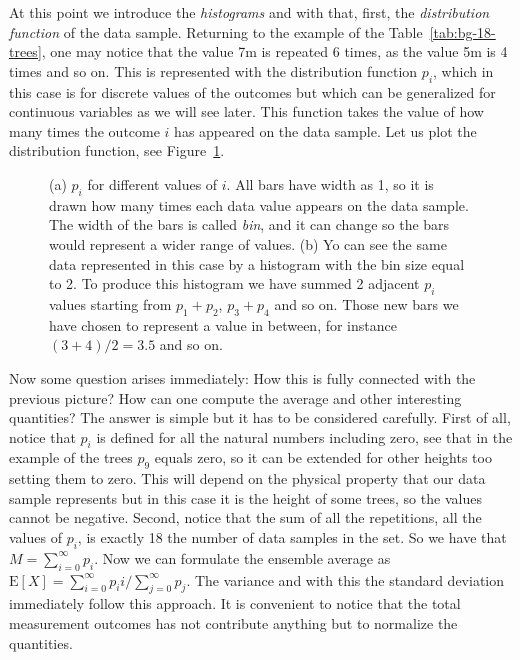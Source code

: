 At this point we introduce the \emph{histograms} and with that, first, the \emph{distribution function} of the data sample.
Returning to the example of the Table~\ref{tab:bg-18-trees}, one may notice that the value 7m is repeated 6 times, as the value 5m is 4 times and so on.
This is represented with the distribution function $p_i$, which in this case is for discrete values of the outcomes but which can be generalized for continuous variables as we will see later.
This function takes the value of how many times the outcome $i$ has appeared on the data sample.
Let us plot the distribution function, see Figure~\ref{fig:bg-histograms}.
\begin{figure}[tp]
  \centering
  \caption[(a) Histogram with small bin. (b) Histogram with bigger bin]{(a) $p_i$ for different values of $i$. All bars have width as 1, so it is drawn how many times each data value appears on the data sample.
  The width of the bars is called \emph{bin}, and it can change so the bars would represent a wider range of values. (b) Yo can see the same data represented in this case by a histogram with the bin size equal to 2. To produce this histogram we have summed 2 adjacent $p_i$ values starting from $p_1+p_2$, $p_3+p_4$ and so on.
  Those new bars we have chosen to represent a value in between, for instance $(3+4)/2=3.5$ and so on.}
  \label{fig:bg-histograms}
\end{figure}

Now some question arises immediately:
How this is fully connected with the previous picture?
How can one compute the average and other interesting quantities?
The answer is simple but it has to be considered carefully.
First of all, notice that $p_i$ is defined for all the natural numbers including zero, see that in the example of the trees $p_9$ equals zero, so it can be extended for other heights too setting them to zero.
This will depend on the physical property that our data sample represents but in this case it is the height of some trees, so the values cannot be negative.
Second, notice that the sum of all the repetitions, all the values of $p_i$, is exactly 18 the number of data samples in the set.
So we have that $M = \sum_{i=0}^{\infty} p_i$.
Now we can formulate the ensemble average as $\text{E}[X]=\sum_{i=0}^{\infty} p_i i / \sum_{j=0}^{\infty} p_j$. The variance and with this the standard deviation immediately follow this approach.
It is convenient to notice that the total measurement outcomes has not contribute anything but to normalize the quantities.

